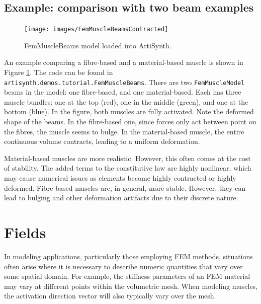 \subsection{Example: comparison with two beam examples}
\label{FemMuscleBeams:sec}

\begin{figure}[ht]
	\centering
	\texttt{[image: images/FemMuscleBeamsContracted]}
	\caption{FemMuscleBeams model loaded into ArtiSynth.}
	\label{fig:fem:musclebeams}
\end{figure}

An example comparing a fibre-based and a material-based muscle is shown 
in Figure \ref{fig:fem:musclebeams}.  The code can be found in 
{\tt artisynth.demos.tutorial.FemMuscleBeams}.  There are two 
{\tt FemMuscleModel} beams in the model: one fibre-based, and one 
material-based.  Each has three muscle bundles: one at the top (red),
one in the middle (green), and one at the bottom (blue).  In the figure,
both muscles are fully activated.  Note the deformed shape of the beams.
In the fibre-based one, since forces only act between point on the fibres,
the muscle seems to bulge.  In the material-based muscle, the entire
continuous volume contracts, leading to a uniform deformation.  

Material-based muscles are more realistic.  However, this often comes at the cost
of stability.  The added terms to the constitutive law are highly nonlinear,
which may cause numerical issues as elements become highly contracted or
highly deformed.  Fibre-based muscles are, in general, more stable.  However,
they can lead to bulging and other deformation artifacts due to their discrete
nature.

\section{Fields}
\label{sec:fields}

In modeling applications, particularly those employing FEM methods,
situations often arise where it is necessary to describe numeric
quantities that vary over some spatial domain. For example, the
stiffness parameters of an FEM material may vary at different points
within the volumetric mesh.  When modeling muscles, the activation
direction vector will also typically vary over the mesh.

